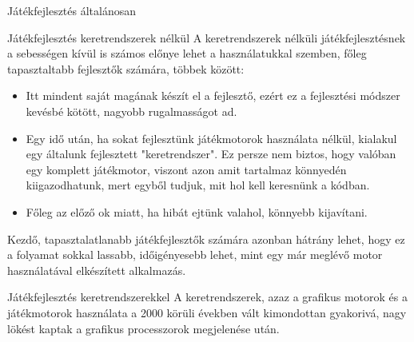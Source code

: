\begin{MyChapter}{Játékfejlesztés általánosan}
\begin{MySection}{Játékfejlesztés keretrendszerek nélkül}
		A keretrendszerek nélküli játékfejlesztésnek a sebességen kívül is számos előnye lehet a használatukkal szemben, főleg tapasztaltabb fejlesztők számára, többek között:
		\begin{itemize}
			\item Itt mindent saját magának készít el a fejlesztő, ezért ez a fejlesztési módszer kevésbé kötött, nagyobb rugalmasságot ad.
			\item Egy idő után, ha sokat fejlesztünk játékmotorok használata nélkül, kialakul egy általunk fejlesztett "keretrendszer". Ez persze nem biztos, hogy valóban egy komplett játékmotor, viszont azon amit tartalmaz könnyedén kiigazodhatunk, mert egyből tudjuk, mit hol kell keresnünk a kódban.
			\item Főleg az előző ok miatt, ha hibát ejtünk valahol, könnyebb kijavítani.
		\end{itemize}
	
		Kezdő, tapasztalatlanabb játékfejlesztők számára azonban hátrány lehet, hogy ez a folyamat sokkal lassabb, időigényesebb lehet, mint egy már meglévő motor használatával elkészített alkalmazás.

	\end{MySection}

	\begin{MySection}{Játékfejlesztés keretrendszerekkel}
		A keretrendszerek, azaz a grafikus motorok és a játékmotorok használata a 2000 körüli években vált kimondottan gyakorivá, nagy lökést kaptak a grafikus processzorok megjelenése után.
		

\end{MySection}
\end{MyChapter}
